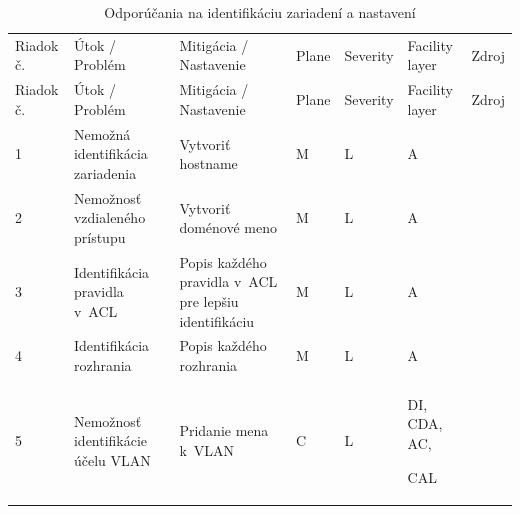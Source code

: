\begin{longtable}[!htbp]{|C{2.5em}L{11em}L{11em}C{2.5em}C{4em}C{5em}L{2.5em}|}
	\caption{Odporúčania na identifikáciu zariadení a nastavení}
	\label{tab:identification}\\ \hline
	\mbox{Riadok} č.&Útok / Problém	&Mitigácia / Nastavenie	&Plane	&Severity	&Facility layer	&Zdroj\\ \hhline{=======}
	\endfirsthead 
	\hline
	\centering
	
	Riadok č.	&Útok / Problém	&Mitigácia / Nastavenie	&Plane	&Severity	&Facility layer	&Zdroj\\ \hhline{=======}
	\endhead
	
	 1	&Nemožná identifikácia zariadenia	&Vytvoriť hostname	&M	&L	&A	& \cite{CIS_DrTLsgXv24lxeIIM}\\
	2	&Nemožnosť vzdialeného prístupu	&Vytvoriť doménové meno	&M	&L	&A	& \cite{CIS_DrTLsgXv24lxeIIM}\\
	 3	&Identifikácia pravidla v~ACL	&Popis každého pravidla v~ACL pre lepšiu identifikáciu	&M	&L	&A	& \cite{Singh2018}\\
	4	&Identifikácia rozhrania	&Popis každého rozhrania	&M	&L	&A	& \cite{Lammle2013}\\
	 5	&Nemožnosť identifikácie účelu VLAN	&Pridanie mena k~VLAN	&C	&L	&DI,
	CDA,
	AC,
	
	CAL	& \cite{Lammle2013}\\	
	\hline
\end{longtable}%

